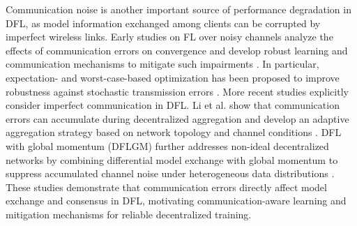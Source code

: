 \documentclass[conference]{IEEEtran}
\begin{document}
Communication noise is another important source of performance degradation in DFL, as model information exchanged among clients can be corrupted by imperfect wireless links. Early studies on FL over noisy channels analyze the effects of communication errors on convergence and develop robust learning and communication mechanisms to mitigate such impairments \cite{wireless_edge_fl,robustwireless}. In particular, expectation- and worst-case-based optimization has been proposed to improve robustness against stochastic transmission errors \cite{NoiseComm}. More recent studies explicitly consider imperfect communication in DFL. Li et al. show that communication errors can accumulate during decentralized aggregation and develop an adaptive aggregation strategy based on network topology and channel conditions \cite{li_imperfect_dfl}. DFL with global momentum (DFLGM) further addresses non-ideal decentralized networks by combining differential model exchange with global momentum to suppress accumulated channel noise under heterogeneous data distributions \cite{li_dflgm}. These studies demonstrate that communication errors directly affect model exchange and consensus in DFL, motivating communication-aware learning and mitigation mechanisms for reliable decentralized training.


\end{document}

